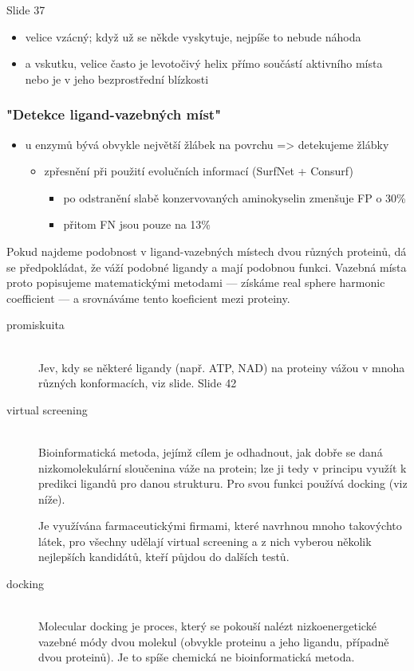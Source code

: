 \documentclass[DIV=8]{scrreprt}
\begin{document}
Slide 37
\begin{itemize}
    \item velice vzácný; když už se někde vyskytuje, nejpíše to nebude náhoda
    \item a vskutku, velice často je levotočivý helix přímo součástí aktivního místa nebo je v jeho bezprostřední blízkosti
\end{itemize}


\subsubsection{"Detekce ligand-vazebných míst"}

\begin{itemize}
    \item u enzymů bývá obvykle největší žlábek na povrchu => detekujeme žlábky
\begin{itemize}
    \item zpřesnění při použití evolučních informací (SurfNet + Consurf)
\begin{itemize}
    \item po odstranění slabě konzervovaných aminokyselin zmenšuje FP o 30\%
    \item přitom FN jsou pouze na 13\%
\end{itemize}

\end{itemize}

\end{itemize}


Pokud najdeme podobnost v ligand-vazebných místech dvou různých proteinů, dá se předpokládat, že váží podobné ligandy a mají podobnou funkci. Vazebná místa proto popisujeme matematickými metodami --- získáme real sphere harmonic coefficient --- a srovnáváme tento koeficient mezi proteiny.

\begin{description}
\item[promiskuita]\hfill \\
Jev, kdy se některé ligandy (např. ATP, NAD) na proteiny vážou v mnoha různých konformacích, viz slide. Slide 42


\item[virtual screening]\hfill \\
Bioinformatická metoda, jejímž cílem je odhadnout, jak dobře se daná nizkomolekulární sloučenina váže na protein; lze ji tedy v principu využít k predikci ligandů pro danou strukturu. Pro svou funkci používá docking (viz níže).

Je využívána farmaceutickými firmami, které navrhnou mnoho takovýchto látek, pro všechny udělají virtual screening a z nich vyberou několik nejlepších kandidátů, kteří půjdou do dalších testů.


\item[docking]\hfill \\
Molecular docking je proces, který se pokouší nalézt nizkoenergetické vazebné módy dvou molekul (obvykle proteinu a jeho ligandu, případně dvou proteinů). Je to spíše chemická ne bioinformatická metoda.

\end{description}
\end{document}
